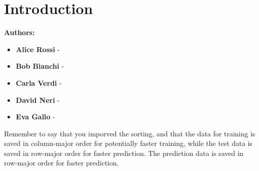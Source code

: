 \section{Introduction}
          
        \begin{minipage}{0.45\textwidth}
            \centering
            \textbf{Authors:}\\[0.5cm]
            \begin{itemize}
                \item \textbf{Alice Rossi} -
                \item \textbf{Bob Bianchi} -
                \item \textbf{Carla Verdi} -
                \item \textbf{David Neri} -
                \item \textbf{Eva Gallo} -
            \end{itemize}
        \end{minipage}
        \vspace{1cm}

Remember to say that you imporved the sorting, and that the data for training is saved in column-major order for potentially faster training, while the test data is saved in row-major order for faster prediction.
The prediction data is saved in row-major order for faster prediction.